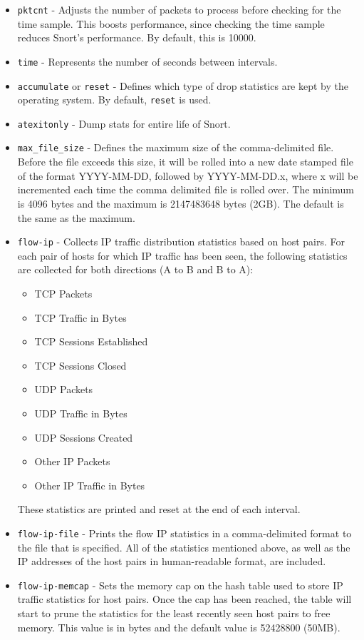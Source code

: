 \documentclass[english]{report}
\begin{document}
\begin{itemize}
\item \texttt{pktcnt} - Adjusts the number of packets to process before
checking for the time sample.  This boosts performance, since checking the time
sample reduces Snort's performance.  By default, this is 10000.  

\item \texttt{time} - Represents the number of seconds between intervals.

\item \texttt{accumulate} or \texttt{reset} - Defines which type of drop
statistics are kept by the operating system. By default, \texttt{reset} is
used.

\item \texttt{atexitonly} - Dump stats for entire life of Snort.

\item \texttt{max\_file\_size} - Defines the maximum size of the
comma-delimited file.  Before the file exceeds this size, it will be rolled
into a new date stamped file of the format YYYY-MM-DD, followed by
YYYY-MM-DD.x, where x will be incremented each time the comma delimited file
is rolled over.  The minimum is 4096 bytes and the maximum is 2147483648 bytes
(2GB).  The default is the same as the maximum.

\item \texttt{flow-ip} - Collects IP traffic distribution statistics based on
host pairs.  For each pair of hosts for which IP traffic has been seen, the
following statistics are collected for both directions (A to B and B to A):
\begin{itemize}
\item TCP Packets
\item TCP Traffic in Bytes
\item TCP Sessions Established
\item TCP Sessions Closed
\item UDP Packets
\item UDP Traffic in Bytes
\item UDP Sessions Created
\item Other IP Packets
\item Other IP Traffic in Bytes
\end{itemize}
These statistics are printed and reset at the end of each interval.

\item \texttt{flow-ip-file} - Prints the flow IP statistics in a
comma-delimited format to the file that is specified.  All of the statistics
mentioned above, as well as the IP addresses of the host pairs in
human-readable format, are included.

\item \texttt{flow-ip-memcap} - Sets the memory cap on the hash table used to
store IP traffic statistics for host pairs.  Once the cap has been reached, the
table will start to prune the statistics for the least recently seen host pairs
to free memory.  This value is in bytes and the default value is
52428800 (50MB).

\end{itemize}
\end{document}
